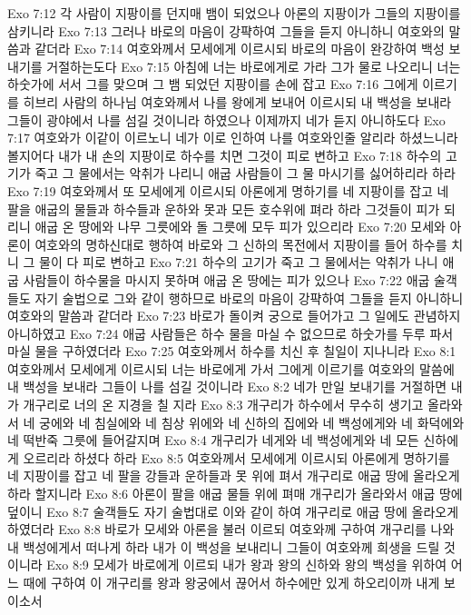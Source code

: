 Exo 7:12  각 사람이 지팡이를 던지매 뱀이 되었으나 아론의 지팡이가 그들의 지팡이를 삼키니라
Exo 7:13  그러나 바로의 마음이 강퍅하여 그들을 듣지 아니하니 여호와의 말씀과 같더라
Exo 7:14  여호와께서 모세에게 이르시되 바로의 마음이 완강하여 백성 보내기를 거절하는도다
Exo 7:15  아침에 너는 바로에게로 가라 그가 물로 나오리니 너는 하숫가에 서서 그를 맞으며 그 뱀 되었던 지팡이를 손에 잡고
Exo 7:16  그에게 이르기를 히브리 사람의 하나님 여호와께서 나를 왕에게 보내어 이르시되 내 백성을 보내라 그들이 광야에서 나를 섬길 것이니라 하였으나 이제까지 네가 듣지 아니하도다
Exo 7:17  여호와가 이같이 이르노니 네가 이로 인하여 나를 여호와인줄 알리라 하셨느니라 볼지어다 내가 내 손의 지팡이로 하수를 치면 그것이 피로 변하고
Exo 7:18  하수의 고기가 죽고 그 물에서는 악취가 나리니 애굽 사람들이 그 물 마시기를 싫어하리라 하라
Exo 7:19  여호와께서 또 모세에게 이르시되 아론에게 명하기를 네 지팡이를 잡고 네 팔을 애굽의 물들과 하수들과 운하와 못과 모든 호수위에 펴라 하라 그것들이 피가 되리니 애굽 온 땅에와 나무 그릇에와 돌 그릇에 모두 피가 있으리라
Exo 7:20  모세와 아론이 여호와의 명하신대로 행하여 바로와 그 신하의 목전에서 지팡이를 들어 하수를 치니 그 물이 다 피로 변하고
Exo 7:21  하수의 고기가 죽고 그 물에서는 악취가 나니 애굽 사람들이 하수물을 마시지 못하며 애굽 온 땅에는 피가 있으나
Exo 7:22  애굽 술객들도 자기 술법으로 그와 같이 행하므로 바로의 마음이 강퍅하여 그들을 듣지 아니하니 여호와의 말씀과 같더라
Exo 7:23  바로가 돌이켜 궁으로 들어가고 그 일에도 관념하지 아니하였고
Exo 7:24  애굽 사람들은 하수 물을 마실 수 없으므로 하숫가를 두루 파서 마실 물을 구하였더라
Exo 7:25  여호와께서 하수를 치신 후 칠일이 지나니라
Exo 8:1  여호와께서 모세에게 이르시되 너는 바로에게 가서 그에게 이르기를 여호와의 말씀에 내 백성을 보내라 그들이 나를 섬길 것이니라
Exo 8:2  네가 만일 보내기를 거절하면 내가 개구리로 너의 온 지경을 칠 지라
Exo 8:3  개구리가 하수에서 무수히 생기고 올라와서 네 궁에와 네 침실에와 네 침상 위에와 네 신하의 집에와 네 백성에게와 네 화덕에와 네 떡반죽 그릇에 들어갈지며
Exo 8:4  개구리가 네게와 네 백성에게와 네 모든 신하에게 오르리라 하셨다 하라
Exo 8:5  여호와께서 모세에게 이르시되 아론에게 명하기를 네 지팡이를 잡고 네 팔을 강들과 운하들과 못 위에 펴서 개구리로 애굽 땅에 올라오게 하라 할지니라
Exo 8:6  아론이 팔을 애굽 물들 위에 펴매 개구리가 올라와서 애굽 땅에 덮이니
Exo 8:7  술객들도 자기 술법대로 이와 같이 하여 개구리로 애굽 땅에 올라오게 하였더라
Exo 8:8  바로가 모세와 아론을 불러 이르되 여호와께 구하여 개구리를 나와 내 백성에게서 떠나게 하라 내가 이 백성을 보내리니 그들이 여호와께 희생을 드릴 것이니라
Exo 8:9  모세가 바로에게 이르되 내가 왕과 왕의 신하와 왕의 백성을 위하여 어느 때에 구하여 이 개구리를 왕과 왕궁에서 끊어서 하수에만 있게 하오리이까 내게 보이소서
